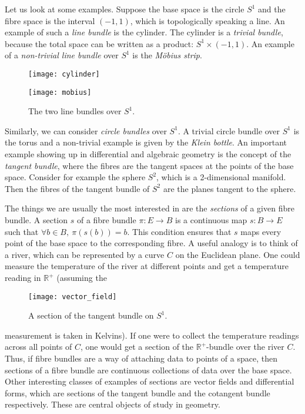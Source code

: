 Let us look at some examples. Suppose the base space is the circle $S^{1}$
and the fibre space is the interval $(-1, 1)$, which is topologically
speaking a line. An example of such a \emph{line bundle} is the cylinder.
The cylinder is a \emph{trivial bundle}, because the total space can
be written as a product: $S^{1}\times (-1,1)$. An example of a
\emph{non-trivial line bundle} over $S^{1}$ is the \emph{Möbius strip}.
\begin{figure}[H]
  \centering
  \begin{minipage}{.45\textwidth}
    \centering
    \texttt{[image: cylinder]}
  \end{minipage}%
  \begin{minipage}{.45\textwidth}
    \centering
    \texttt{[image: mobius]}
  \end{minipage}
  \caption{The two line bundles over $S^{1}$.}
\end{figure}
Similarly, we can consider \emph{circle bundles} over $S^{1}$. A trivial
circle bundle over $S^{1}$ is the torus and a non-trivial example is given
by the \emph{Klein bottle}.
An important example showing up in differential and algebraic geometry
is the concept of the \emph{tangent bundle}, where the fibres are the
tangent spaces at the points of the base space. Consider for example the
sphere $S^{2}$, which is a 2-dimensional manifold. Then the fibres of 
the tangent bundle of $S^{2}$ are the planes tangent to the sphere.

The things we are usually the most interested in are the \emph{sections} of
a given fibre bundle. A section $s$ of a fibre bundle $\pi:E\to B$
is a continuous map $s:B\to E$ such that $\forall b\in B,\ \pi(s(b))=b$.
This condition ensures that $s$ maps every point of the base space to the
corresponding fibre. A useful analogy is to think of a river, which can
be represented by a curve $C$ on the Euclidean plane. One could measure the
temperature of the river at different points and get a temperature reading
in $\mathbb{R}^{+}$ (assuming the
\begin{wrapfigure}{r}{0.3\textwidth} %
  \centering
  \texttt{[image: vector\_field]}
  \caption{A section of the tangent bundle on $S^{1}$.}
\end{wrapfigure}
 measurement is taken in Kelvins).
If one were to collect the temperature readings across all points of $C$,
one would get a section of the $\mathbb{R}^{+}$-bundle over the river $C$.
Thus, if fibre bundles are a way of attaching data to points of a space,
then sections of a fibre bundle are continuous collections of data over the
base space. Other interesting classes of examples of sections are vector
fields and differential forms, which are sections of the tangent bundle
and the cotangent bundle respectively. These are central objects of study
in geometry.


